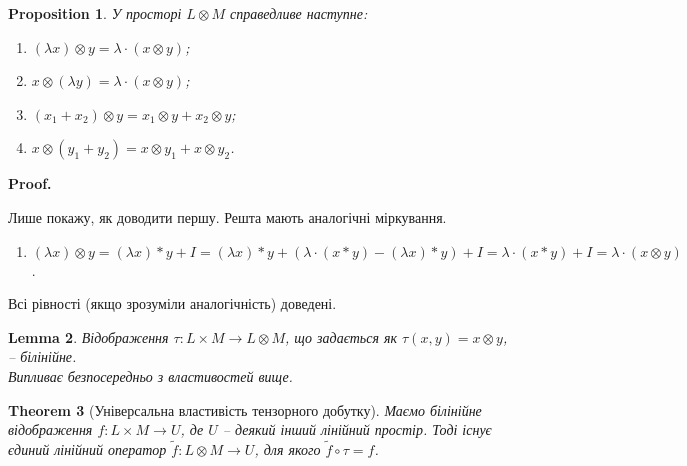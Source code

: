 \documentclass[a4paper, 10pt]{article}
\makeatletter
\theoremstyle{theoremdd}
\newtheorem{theorem}{Theorem}[subsection]
\newtheorem{proposition}[theorem]{Proposition}
\newtheorem{lemma}[theorem]{Lemma}
\renewenvironment{proof}[1][Proof.\\]{\par
\pushQED{\hfill \qed}%
\normalfont \topsep6\p@\@plus6\p@\relax
\trivlist
\item\relax
{\bfseries
#1\@addpunct{.}}\hspace\labelsep\ignorespaces
}{%
\popQED\endtrivlist\@endpefalse
}
\makeatother
\begin{document}
\begin{proposition}
У просторі $L \otimes M$ справедливе наступне:
\begin{enumerate}[nosep,wide=0pt,label={\arabic*)}]
\item $(\lambda x) \otimes y = \lambda \cdot (x \otimes y)$;
\item $x \otimes (\lambda y) = \lambda \cdot (x \otimes y)$;
\item $(x_1 + x_2) \otimes y = x_1 \otimes y + x_2 \otimes y$;
\item $x \otimes (y_1 + y_2) = x \otimes y_1 + x \otimes y_2$.
\end{enumerate}
\end{proposition}

\begin{proof}
Лише покажу, як доводити першу. Решта мають аналогічні міркування.
\begin{enumerate}[wide=0pt,label={\arabic*)}]
\item $(\lambda x) \otimes y = (\lambda x)*y + I = (\lambda x)*y + (\lambda \cdot (x*y) - (\lambda x)*y) + I = \lambda \cdot (x*y) + I = \lambda \cdot (x \otimes y)$.
\end{enumerate}
Всі рівності (якщо зрозуміли аналогічність) доведені.
\end{proof}

\begin{lemma}
Відображення $\tau \colon L \times M \to L \otimes M$, що задається як $\tau(x,y) = x \otimes y$, -- білінійне.\\
\textit{Випливає безпосередньо з властивостей вище}.
\end{lemma}

\begin{theorem}[Універсальна властивість тензорного добутку]
Маємо білінійне відображення $f \colon L \times M \to U$, де $U$ -- деякий інший лінійний простір. Тоді існує єдиний лінійний оператор $\tilde{f} \colon L \otimes M \to U$, для якого $\tilde{f} \circ \tau = f$.
\end{theorem}
\end{document}
